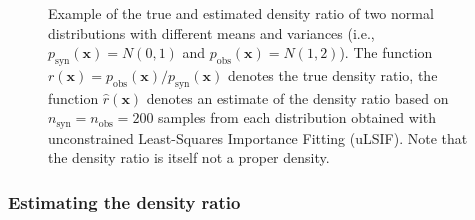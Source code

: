 \documentclass[
]{article}
\newcommand{\pobs}{p_{\text{obs}}}
\newcommand{\psyn}{p_{\text{syn}}}
\newcommand{\nobs}{n_{\text{obs}}}
\newcommand{\nsyn}{n_{\text{syn}}}
\newcommand{\bx}{\mathbf{x}}
\begin{document}
\begin{figure}[t]


\caption{\label{fig-dr-plot}Example of the true and estimated density
ratio of two normal distributions with different means and variances
(i.e., \(\psyn(\bx) = N(0,1)\) and \(\pobs(\bx) = N(1,2)\)). The
function \(r(\bx) = \pobs(\bx)/\psyn(\bx)\) denotes the true density
ratio, the function \(\hat{r}(\bx)\) denotes an estimate of the density
ratio based on \(\nsyn = \nobs = 200\) samples from each distribution
obtained with unconstrained Least-Squares Importance Fitting (uLSIF).
Note that the density ratio is itself not a proper density.}

\end{figure}%

\linespread{2}

\subsubsection{Estimating the density
ratio}\label{estimating-the-density-ratio}
\end{document}
